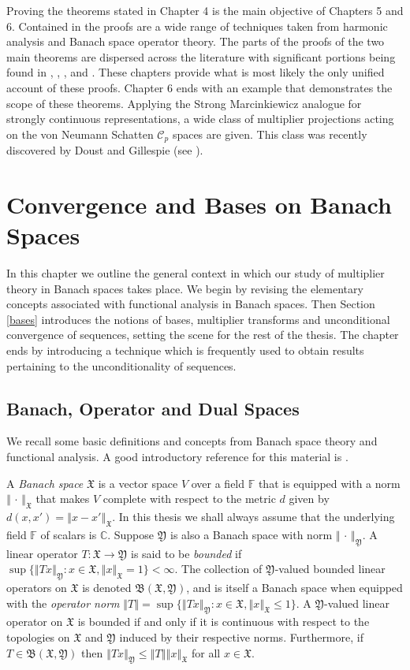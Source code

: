 \documentclass[mmath,12pt]{unswthesis}   %
\newcommand{\C}{\mathbb{C}}
\newcommand{\F}{\mathbb{F}}
\newcommand{\B}{\mathfrak{B}}
\newcommand{\X}{\mathfrak{X}}
\newcommand{\Y}{\mathfrak{Y}}
\newcommand{\CC}{\mathcal{C}}
\def\norm#1{\left \Vert #1 \right \Vert}
\numberwithin{equation}{section}
\begin{document}
Proving the theorems stated in Chapter 4 is the main objective of 
Chapters 5 and 6. Contained in the proofs are a wide range of techniques
taken from harmonic analysis and Banach space operator theory. 
The parts of the proofs of the two main theorems are dispersed across the 
literature with significant portions being found in
\cite{BBG}, \cite{BG Fourier}, \cite{BG Spectral}, \cite{BGM} and \cite{Bourg}.
These chapters provide what is most likely the only unified account of these
proofs. Chapter 6 ends
with an example that demonstrates the scope of these theorems. Applying the
Strong Marcinkiewicz analogue for strongly continuous representations, a wide
class of multiplier
projections acting on the von Neumann Schatten $\CC_p$ spaces are given. This
class was recently discovered by Doust and Gillespie (see \cite{DG}).



\chapter{Convergence and Bases on Banach Spaces}



In this chapter we outline the general context in which our study of multiplier
theory in Banach spaces
takes place. We begin by revising the elementary concepts
associated with functional analysis in Banach spaces. Then Section \ref{bases}
introduces the notions of bases, multiplier transforms and unconditional
convergence of sequences, setting the scene for the rest of the thesis. The 
chapter ends by introducing a technique which is frequently used to obtain 
results pertaining to the unconditionality of sequences.


\section{Banach, Operator and Dual Spaces}\label{Banach Spaces}

We recall some basic definitions and concepts from Banach space theory and
functional analysis. A good introductory reference for this material is 
\cite{Con}.

A {\em Banach space} $\X$ is a vector space $V$ over a field $\F$ that is 
equipped with a norm
$\norm{\,\cdot\,}_{\X}$ that makes $V$ complete with respect to the metric $d$
given by $d(x,x')=\norm{x-x'}_{\X}$. In this thesis we shall always assume that
the
underlying field $\F$ of scalars is $\C$. Suppose $\Y$ is also a Banach space
with norm $\norm{\,\cdot\,}_{\Y}$. A linear operator
$T:\X\rightarrow\Y$ is said to be {\em bounded} if
$\sup\{\norm{Tx}_{\Y}:x\in\X,\norm{x}_{\X}=1\}<\infty$. The collection of
$\Y$-valued bounded linear operators on $\X$ is denoted $\B(\X,\Y)$, and is
itself a Banach space when equipped with the {\em operator norm}
$\norm{T}=\sup\{\norm{Tx}_{\Y}:x\in\X,\norm{x}_{\X}\leq 1\}$. A $\Y$-valued
linear
operator on $\X$ is bounded if and only if it is continuous with respect to the
topologies on $\X$ and $\Y$ induced by their respective norms. Furthermore, if
$T\in\B(\X,\Y)$ then $\norm{Tx}_{\Y}\leq\norm{T}\norm{x}_{\X}$ for all $x\in\X$.
\end{document}
